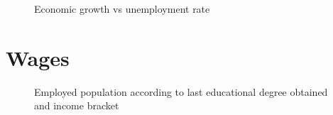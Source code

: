 \documentclass[
  ignorenonframetext,
]{beamer}
\begin{document}
\begin{frame}{}
\label{section-8}
\begin{figure}


\caption{\label{fig-economic-growth-ur-col}Economic growth vs
unemployment rate}

\end{figure}%
\end{frame}

\section{Wages}\label{wages}

\begin{frame}{}
\label{section-9}
\begin{figure}


\caption{\label{fig-income-education-level-1}Employed population
according to last educational degree obtained and income bracket}

\end{figure}%
\end{frame}
\end{document}
